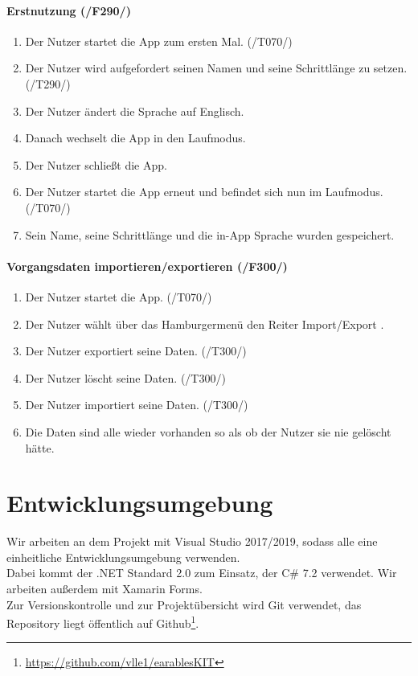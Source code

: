 \documentclass[a4paper,12pt]{article}
\begin{document}
      \paragraph{Erstnutzung (/F290/)}
      \begin{enumerate}
        \item Der Nutzer startet die App zum ersten Mal. (/T070/)
        \item Der Nutzer wird aufgefordert seinen Namen und seine Schrittlänge zu setzen. (/T290/)
        \item Der Nutzer ändert die Sprache auf Englisch.
        \item Danach wechselt die App in den \glqq Laufmodus\grqq.
        \item Der Nutzer schließt die App.
        \item Der Nutzer startet die App erneut und befindet sich nun im \glqq Laufmodus\grqq. (/T070/)
        \item Sein Name, seine Schrittlänge und die in-App Sprache wurden gespeichert.
      \end{enumerate}

      \paragraph{Vorgangsdaten importieren/exportieren (/F300/)}
      \begin{enumerate}
        \item Der Nutzer startet die App. (/T070/)
        \item Der Nutzer wählt über das Hamburgermenü den Reiter \glqq{}Import/Export \grqq{}.
        \item Der Nutzer exportiert seine Daten. (/T300/)
        \item Der Nutzer löscht seine Daten. (/T300/)
        \item Der Nutzer importiert seine Daten. (/T300/)
        \item Die Daten sind alle wieder vorhanden so als ob der Nutzer sie nie gelöscht hätte.
      \end{enumerate}

\section{Entwicklungsumgebung}
Wir arbeiten an dem Projekt mit Visual Studio 2017/2019, sodass alle eine einheitliche Entwicklungsumgebung verwenden.\\
Dabei kommt der .NET Standard 2.0 zum Einsatz, der C\# 7.2 verwendet. Wir arbeiten außerdem mit Xamarin Forms.\\
Zur Versionskontrolle und zur Projektübersicht wird Git verwendet, das Repository liegt öffentlich auf Github\footnote{\url{https://github.com/vlle1/earablesKIT}}.
\clearpage
\printglossaries
{}
\end{document}
